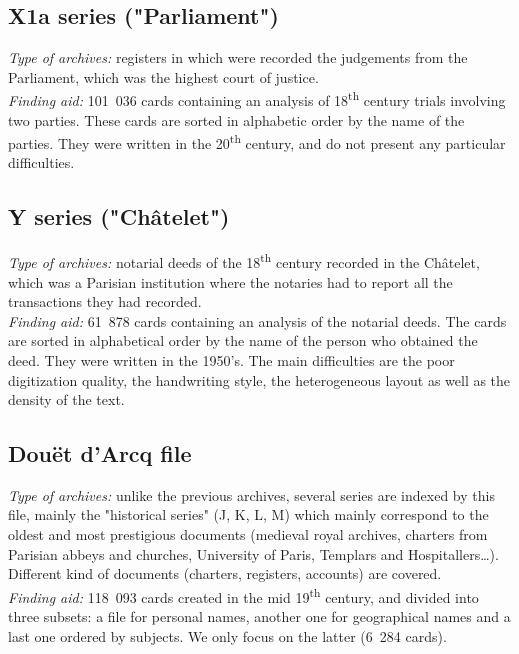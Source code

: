 \documentclass[runningheads]{llncs}
\begin{document}
\subsection*{X1a series ("Parliament")}

\textit{Type of archives:} registers in which were recorded the judgements from the Parliament, which was the highest court of justice.\\
\textit{Finding aid:} 101~036 cards containing an analysis of 18\textsuperscript{th} century trials involving two parties. These cards are sorted in alphabetic order by the name of the parties. They were written in the 20\textsuperscript{th} century, and do not present any particular difficulties.





\subsection*{Y series ("Châtelet")}

\textit{Type of archives:} notarial deeds of the 18\textsuperscript{th} century recorded in the Châtelet, which was a Parisian institution where the notaries had to report all the transactions they had recorded.\\
\textit{Finding aid:} 61~878 cards containing an analysis of the notarial deeds. The cards are sorted in alphabetical order by the name of the person who obtained the deed. They were written in the 1950's. The main difficulties are the poor digitization quality, the handwriting style, the heterogeneous layout as well as the density of the text.






\subsection*{Douët d'Arcq file}

\textit{Type of archives:} unlike the previous archives, several series are indexed by this file, mainly the "historical series" (J, K, L, M) which mainly correspond to the oldest and most prestigious documents (medieval royal archives, charters from Parisian abbeys and churches, University of Paris, Templars and Hospitallers…). Different kind of documents (charters, registers, accounts) are covered.\\
\textit{Finding aid:} 118~093 cards created in the mid 19\textsuperscript{th} century, and divided into three subsets: a file for personal names, another one for geographical names and a last one ordered by subjects. We only focus on the latter (6~284 cards). 
\end{document}
